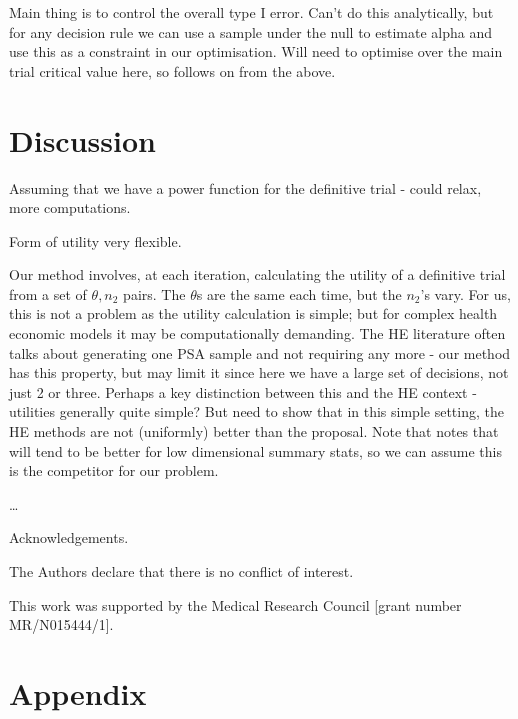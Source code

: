 \documentclass[sagev, Crown]{sagej} %
\begin{document}
Main thing is to control the overall type I error. Can't do this analytically, but for any decision rule we can use a sample under the null to estimate alpha and use this as a constraint in our optimisation. Will need to optimise over the main trial critical value here, so follows on from the above.



\section{Discussion}

Assuming that we have a power function for the definitive trial - could relax, more computations.

Form of utility very flexible.

Our method involves, at each iteration, calculating the utility of a definitive trial from a set of $\theta, n_2$ pairs. The $\theta$s are the same each time, but the $n_2$'s vary. For us, this is not a problem as the utility calculation is simple; but for complex health economic models it may be computationally demanding. The HE literature often talks about generating one PSA sample and not requiring any more - our method has this property, but may limit it since here we have a large set of decisions, not just 2 or three. Perhaps a key distinction between this and the HE context - utilities generally quite simple? But need to show that in this simple setting, the HE methods are not (uniformly) better than the proposal. Note that \cite{Heath2017} notes that \cite{Strong2015} will tend to be better for low dimensional summary stats, so we can assume this is the competitor for our problem.



\ldots

\begin{acks}
Acknowledgements.
\end{acks}

\begin{dci}
The Authors declare that there is no conflict of interest.
\end{dci}

\begin{funding}
This work was supported by the Medical Research Council [grant number MR/N015444/1].
\end{funding}




\section*{Appendix}
\end{document}

